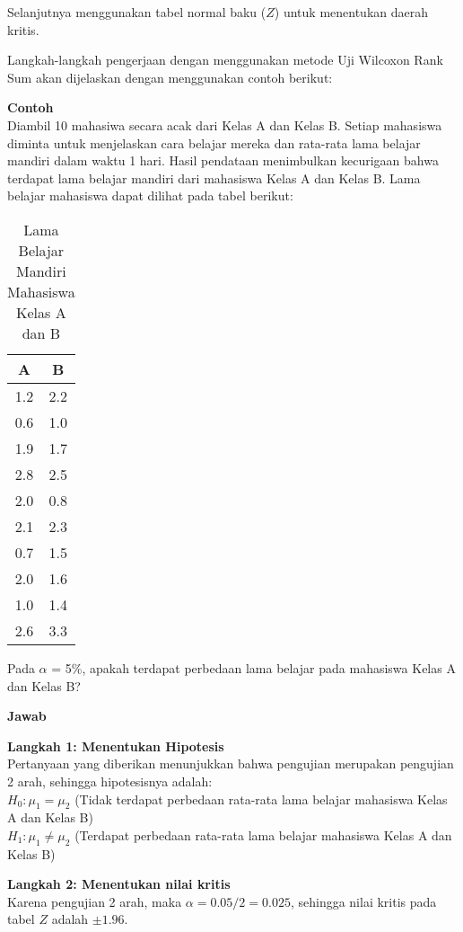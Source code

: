 \documentclass[
]{book}
\begin{document}
Selanjutnya menggunakan tabel normal baku (\(Z\)) untuk menentukan daerah kritis.

Langkah-langkah pengerjaan dengan menggunakan metode Uji Wilcoxon Rank Sum akan dijelaskan dengan menggunakan contoh berikut:

\textbf{Contoh}\\
Diambil 10 mahasiwa secara acak dari Kelas A dan Kelas B. Setiap mahasiswa diminta untuk menjelaskan cara belajar mereka dan rata-rata lama belajar mandiri dalam waktu 1 hari. Hasil pendataan menimbulkan kecurigaan bahwa terdapat lama belajar mandiri dari mahasiswa Kelas A dan Kelas B. Lama belajar mahasiswa dapat dilihat pada tabel berikut:

\begin{table}

\caption{\label{tab:unnamed-chunk-11}Lama Belajar Mandiri Mahasiswa Kelas A dan B}
\centering
\begin{tabular}[t]{c|c}
\hline
A & B\\
\hline
1.2 & 2.2\\
\hline
0.6 & 1.0\\
\hline
1.9 & 1.7\\
\hline
2.8 & 2.5\\
\hline
2.0 & 0.8\\
\hline
2.1 & 2.3\\
\hline
0.7 & 1.5\\
\hline
2.0 & 1.6\\
\hline
1.0 & 1.4\\
\hline
2.6 & 3.3\\
\hline
\end{tabular}
\end{table}

Pada \(\alpha\) = 5\%, apakah terdapat perbedaan lama belajar pada mahasiswa Kelas A dan Kelas B?

\textbf{Jawab}

\textbf{Langkah 1: Menentukan Hipotesis}\\
Pertanyaan yang diberikan menunjukkan bahwa pengujian merupakan pengujian 2 arah, sehingga hipotesisnya adalah:\\
\(H_0: \mu_1 = \mu_2\) (Tidak terdapat perbedaan rata-rata lama belajar mahasiswa Kelas A dan Kelas B)\\
\(H_1: \mu_1 \neq \mu_2\) (Terdapat perbedaan rata-rata lama belajar mahasiswa Kelas A dan Kelas B)

\textbf{Langkah 2: Menentukan nilai kritis}\\
Karena pengujian 2 arah, maka \(\alpha = 0.05/2 = 0.025\), sehingga nilai kritis pada tabel \(Z\) adalah \(\pm 1.96\).
\end{document}

